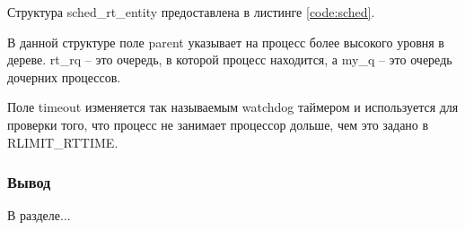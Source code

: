 Структура sched\_rt\_entity предоставлена в листинге \ref{code:sched}.


В данной структуре поле parent указывает на процесс более высокого уровня в дереве. rt\_rq -- это очередь, в которой процесс находится, а my\_q -- это очередь дочерних процессов.

Поле timeout изменяется так называемым watchdog таймером и используется для проверки того, что процесс не занимает процессор дольше, чем это задано в RLIMIT\_RTTIME.



\subsubsection*{Вывод}
В разделе...

\pagebreak